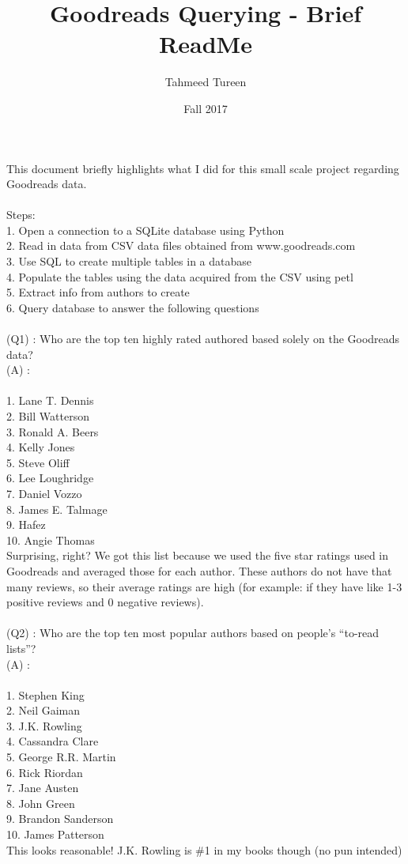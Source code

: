 \documentclass[11pt]{article}
\begin{document}
\title{Goodreads Querying - Brief ReadMe}
\author{Tahmeed Tureen}
\date{Fall 2017}
\maketitle

This document briefly highlights what I did for this small scale project regarding Goodreads data.\\~\\

Steps:\\
1. Open a connection to a SQLite database using Python\\
2. Read in data from CSV data files obtained from www.goodreads.com\\
3. Use SQL to create multiple tables in a database\\
4. Populate the tables using the data acquired from the CSV using petl\\
5. Extract info from authors to create\\
6. Query database to answer the following questions\\~\\


(Q1) : Who are the top ten highly rated authored based solely on the Goodreads data?\\

(A) :\\~\\
1. Lane T. Dennis\\
2. Bill Watterson\\
3. Ronald A. Beers\\
4. Kelly Jones\\
5. Steve Oliff\\
6. Lee Loughridge\\
7. Daniel Vozzo\\
8. James E. Talmage\\
9. Hafez\\
10. Angie Thomas\\

Surprising, right? We got this list because we used the five star ratings used in Goodreads and averaged those for each author. These authors do not have that many reviews, so their average ratings are high (for example: if they have like 1-3 positive reviews and 0 negative reviews).\\~\\

(Q2) : Who are the top ten most popular authors based on people's ``to-read lists''?\\

(A) :\\~\\
1. Stephen King\\
2. Neil Gaiman\\
3. J.K. Rowling\\
4. Cassandra Clare\\
5. George R.R. Martin\\
6. Rick Riordan\\
7. Jane Austen\\
8. John Green\\
9. Brandon Sanderson\\
10. James Patterson\\

This looks reasonable! J.K. Rowling is \#1 in my books though (no pun intended)
\end{document}
